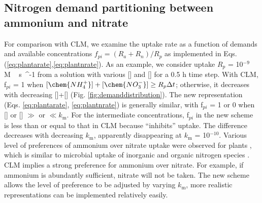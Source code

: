 \documentclass[gmd, manuscript]{copernicus}
\begin{document}
\subsection{Nitrogen demand partitioning between ammonium and nitrate}
For comparison with CLM, we examine the uptake rate as a function of demands
and available concentrations 
$f_{pi} = ({R_a + R_n})/{R_p}$ as implemented in Eqs. (\ref{eq:plantarate},\ref{eq:plantnrate}).
As an example, we consider uptake $R_p$ = 10$^{-9}$ \unit{M\,s{^{-1}}} from a
solution with various [] and [] for a 0.5 h time
step. With CLM, f$_{pi}$ = 1 when $[\chem{NH_4^+}]+[\chem{NO_3^-}]\geq
R_p\Delta t$; otherwise, it decreases with decreasing
[]+[] (Fig. \ref{fig:demanddistribution}). The new
representation (Eqs. \ref{eq:plantarate}, \ref{eq:plantnrate}) is generally
similar, with f$_{pi}$ = 1 or 0 when [] or [] $\gg$
or $\ll k_\text{m}$. For the intermediate concentrations, f$_{pi}$ in the new
scheme is less than or equal to that in CLM because  ``inhibits''
 uptake. The difference decreases with decreasing $k_\text{m}$,
apparently disappearing at $k_\text{m}$ = 10$^{-10}$. 
Various level of preferences of ammonium over nitrate uptake were observed for plants
\citep{Pfautsch2009,Warren2007,Nordin2001,Falkengren1995,Gherardi2013}, which is similar to 
microbial uptake of inorganic and organic nitrogen species
\citep{Fouilland2007,Kirchman1994,Kirchman1998,Middelburg2000,Veuger2004}. CLM
implies a strong preference for ammonium over nitrate. For example, if
ammonium is abundantly sufficient, nitrate will not be taken. The new scheme
allows the level of preference to be adjusted by varying $k_\text{m}$, more
realistic representations can be implemented relatively easily. 
\end{document}
